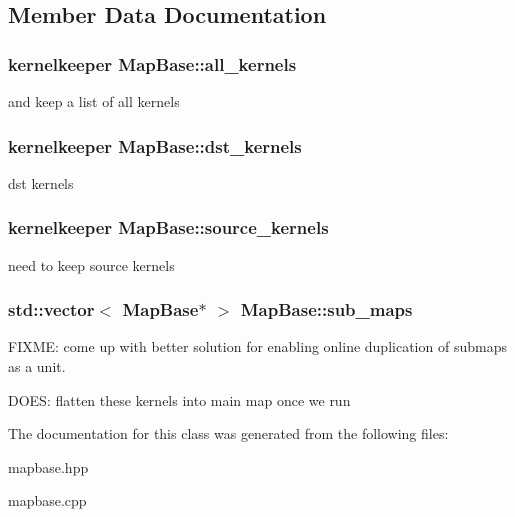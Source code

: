 \subsection{Member Data Documentation}
\hypertarget{class_map_base_a2220cd630c5d00708f08d9bc70a48220}{}
\subsubsection[{all\+\_\+kernels}]{\setlength{\rightskip}{0pt plus 5cm}kernelkeeper Map\+Base\+::all\+\_\+kernels\hspace{0.3cm}{\ttfamily [protected]}}\label{class_map_base_a2220cd630c5d00708f08d9bc70a48220}
and keep a list of all kernels \hypertarget{class_map_base_a83bb7ac6b0e80882356946d19da7ce4a}{}
\subsubsection[{dst\+\_\+kernels}]{\setlength{\rightskip}{0pt plus 5cm}kernelkeeper Map\+Base\+::dst\+\_\+kernels\hspace{0.3cm}{\ttfamily [protected]}}\label{class_map_base_a83bb7ac6b0e80882356946d19da7ce4a}
dst kernels \hypertarget{class_map_base_a2541cb37a237e66fc88129f9f0b02f50}{}
\subsubsection[{source\+\_\+kernels}]{\setlength{\rightskip}{0pt plus 5cm}kernelkeeper Map\+Base\+::source\+\_\+kernels\hspace{0.3cm}{\ttfamily [protected]}}\label{class_map_base_a2541cb37a237e66fc88129f9f0b02f50}
need to keep source kernels \hypertarget{class_map_base_abc4856ed552e77510211851f0a4a02ab}{}
\subsubsection[{sub\+\_\+maps}]{\setlength{\rightskip}{0pt plus 5cm}std\+::vector$<$ {\bf Map\+Base}$\ast$ $>$ Map\+Base\+::sub\+\_\+maps\hspace{0.3cm}{\ttfamily [protected]}}\label{class_map_base_abc4856ed552e77510211851f0a4a02ab}
F\+I\+X\+M\+E\+: come up with better solution for enabling online duplication of submaps as a unit.

D\+O\+E\+S\+: flatten these kernels into main map once we run 

The documentation for this class was generated from the following files\+:\begin{DoxyCompactItemize}
\item 
mapbase.\+hpp\item 
mapbase.\+cpp\end{DoxyCompactItemize}
